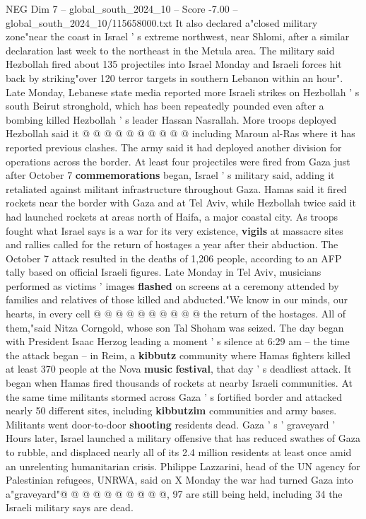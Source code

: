\begin{textsample}{NEG Dim 7 – global\_south\_2024\_10 – Score -7.00 – global\_south\_2024\_10/115658000.txt}
It also declared a"closed military zone"near the coast in Israel ' s extreme northwest, near Shlomi, after a similar declaration last week to the northeast in the Metula area.
The military said Hezbollah fired about 135 projectiles into Israel Monday and Israeli forces hit back by striking"over 120 terror targets in southern Lebanon within an hour".
Late Monday, Lebanese state media reported more Israeli strikes on Hezbollah ' s south Beirut stronghold, which has been repeatedly pounded even after a bombing killed Hezbollah ' s leader Hassan Nasrallah.
More troops deployed Hezbollah said it @ @ @ @ @ @ @ @ @ @ including Maroun al-Ras where it has reported previous clashes.
The army said it had deployed another division for operations across the border.
At least four projectiles were fired from Gaza just after October 7 \textbf{commemorations} began, Israel ' s military said, adding it retaliated against militant infrastructure throughout Gaza.
Hamas said it fired rockets near the border with Gaza and at Tel Aviv, while Hezbollah twice said it had launched rockets at areas north of Haifa, a major coastal city.
As troops fought what Israel says is a war for its very existence, \textbf{vigils} at massacre sites and rallies called for the return of hostages a year after their abduction.
The October 7 attack resulted in the deaths of 1,206 people, according to an AFP tally based on official Israeli figures.
Late Monday in Tel Aviv, musicians performed as victims ' images \textbf{flashed} on screens at a ceremony attended by families and relatives of those killed and abducted."We know in our minds, our hearts, in every cell @ @ @ @ @ @ @ @ @ @ the return of the hostages.
All of them,"said Nitza Corngold, whose son Tal Shoham was seized.
The day began with President Isaac Herzog leading a moment ' s silence at 6:29 am -- the time the attack began -- in Reim, a \textbf{kibbutz} community where Hamas fighters killed at least 370 people at the Nova \textbf{music} \textbf{festival}, that day ' s deadliest attack.
It began when Hamas fired thousands of rockets at nearby Israeli communities.
At the same time militants stormed across Gaza ' s fortified border and attacked nearly 50 different sites, including \textbf{kibbutzim} communities and army bases.
Militants went door-to-door \textbf{shooting} residents dead.
Gaza ' s ' graveyard ' Hours later, Israel launched a military offensive that has reduced swathes of Gaza to rubble, and displaced nearly all of its 2.4 million residents at least once amid an unrelenting humanitarian crisis.
Philippe Lazzarini, head of the UN agency for Palestinian refugees, UNRWA, said on X Monday the war had turned Gaza into a"graveyard"@ @ @ @ @ @ @ @ @ @, 97 are still being held, including 34 the Israeli military says are dead.

\end{textsample}
